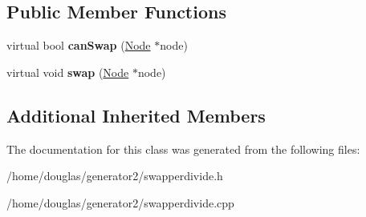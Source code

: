 \subsection*{Public Member Functions}
\begin{DoxyCompactItemize}
\item 
virtual bool {\bfseries can\+Swap} (\hyperlink{classNode}{Node} $\ast$node)\hypertarget{classSwapperDivide_aa50ae3351ddc3917bcbeb1b22728cc63}{}\label{classSwapperDivide_aa50ae3351ddc3917bcbeb1b22728cc63}

\item 
virtual void {\bfseries swap} (\hyperlink{classNode}{Node} $\ast$node)\hypertarget{classSwapperDivide_af0816de678e18182316321fb93c7c033}{}\label{classSwapperDivide_af0816de678e18182316321fb93c7c033}

\end{DoxyCompactItemize}
\subsection*{Additional Inherited Members}


The documentation for this class was generated from the following files\+:\begin{DoxyCompactItemize}
\item 
/home/douglas/generator2/swapperdivide.\+h\item 
/home/douglas/generator2/swapperdivide.\+cpp\end{DoxyCompactItemize}
